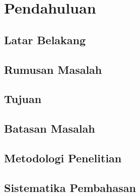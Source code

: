 \chapter{Pendahuluan}
\label{chap:pendahuluan}

\lipsum[1-3]

\section{Latar Belakang}
\label{sec:latar_belakang}

\lipsum[1-3]

\section{Rumusan Masalah}
\label{sec:rumusan_masalah}

\lipsum[1-3]

\section{Tujuan}
\label{sec:tujuan}

\lipsum[1-3]

\section{Batasan Masalah}
\label{sec:batasan_masalah}

\lipsum[1-3]

\section{Metodologi Penelitian}
\label{sec:metodologi_penelitian}

\lipsum[1-3]

\section{Sistematika Pembahasan}
\label{sec:sistematika_pembahasan}

\lipsum[1-3]